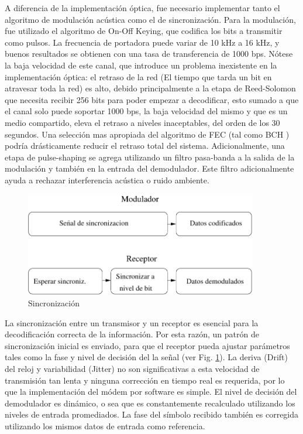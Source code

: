 A diferencia de la implementación óptica, fue necesario implementar tanto el algoritmo de modulación acústica como el de sincronización.
Para la modulación, fue utilizado el algoritmo de On-Off Keying, que codifica los bits a transmitir como pulsos. La frecuencia de portadora puede variar de 10 kHz a 16 kHz, y buenos resultados se obtienen con una tasa de transferencia de 1000 bps. Nótese la baja velocidad de este canal, que introduce un problema inexistente en la implementación óptica: el retraso de la red (El tiempo que tarda un bit en atravesar toda la red) es alto, debido principalmente a la etapa de Reed-Solomon que necesita recibir 256 bits para poder empezar a decodificar, esto sumado a que el canal solo puede soportar 1000 bps, la baja velocidad del mismo y que es un medio compartido, eleva el retraso a niveles inaceptables, del orden de los 30 segundos.
Una selección mas apropiada del algoritmo de FEC (tal como BCH \cite{Moon:05}) podría drásticamente reducir el retraso total del sistema.
Adicionalmente, una etapa de pulse-shaping se agrega utilizando un filtro pasa-banda a la salida de la modulación y también en la entrada del demodulador. Este filtro adicionalmente ayuda a rechazar interferencia acústica o ruido ambiente.

\begin{figure}[t]
  \centering
    \includegraphics[width=4in]{graphs/Audio-Sync2.pdf}
    \caption{Sincronización}
    \label{arch:sync}
\end{figure}



La sincronización entre un transmisor y un receptor es esencial para la decodificación correcta de la información. Por esta razón, un patrón de sincronización inicial es enviado, para que el receptor pueda ajustar parámetros tales como la fase y nivel de decisión del la señal (ver Fig. \ref{arch:sync}). La deriva (Drift) del reloj y variabilidad (Jitter) no son significativas a esta velocidad de transmisión tan lenta y ninguna corrección en tiempo real es requerida, por lo que la implementación del módem por software es simple.
El nivel de decisión del demodulador es dinámico, o sea que es constantemente recalculado utilizando los niveles de entrada promediados.
La fase del símbolo recibido también es corregida utilizando los mismos datos de entrada como referencia.

